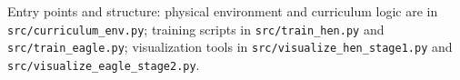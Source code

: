 \documentclass[12pt]{article}
\begin{document}
Entry points and structure: physical environment and curriculum logic are in \texttt{src/curriculum\_env.py}; training scripts in \texttt{src/train\_hen.py} and \texttt{src/train\_eagle.py}; visualization tools in \texttt{src/visualize\_hen\_stage1.py} and \texttt{src/visualize\_eagle\_stage2.py}.

\newpage


\nocite{schulman2017ppo,lillicrap2016ddpg,cai2023multiphase,bengio2009curriculum,foerster2016learning,nguyen2020deep,haarnoja2018sac,raffin2022stable,tassa2018deepmind}


\end{document}
